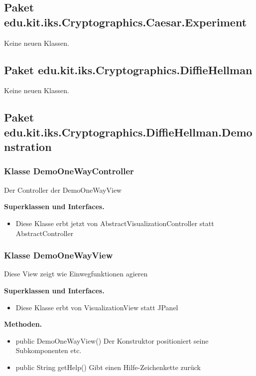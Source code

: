 \documentclass{article}
\begin{document}
  \subsection{Paket edu.kit.iks.Cryptographics.Caesar.Experiment}
   Keine neuen Klassen.
  \subsection{Paket edu.kit.iks.Cryptographics.DiffieHellman}
   Keine neuen Klassen.
  \subsection{Paket edu.kit.iks.Cryptographics.DiffieHellman.Demonstration}

	\subsubsection{Klasse DemoOneWayController}
    Der Controller der DemoOneWayView\newline

	    \textbf{Superklassen und Interfaces.}\newline
	   \begin{itemize}
            \item Diese Klasse erbt jetzt von AbstractVisualizationController statt AbstractController\newline
           \end{itemize}

	\subsubsection{Klasse DemoOneWayView}
    Diese View zeigt wie Einwegfunktionen agieren\newline

	    \textbf{Superklassen und Interfaces.}\newline
	   \begin{itemize}
            \item Diese Klasse erbt von VisualizationView statt JPanel\newline
           \end{itemize}

    \textbf{Methoden.}\newline
	   \begin{itemize}
           \item public DemoOneWayView() \newline
               Der Konstruktor positioniert seine Subkomponenten etc.\newline
           \item public String getHelp() \newline
               Gibt einen Hilfe-Zeichenkette zurück\newline
           \end{itemize}
\end{document}
